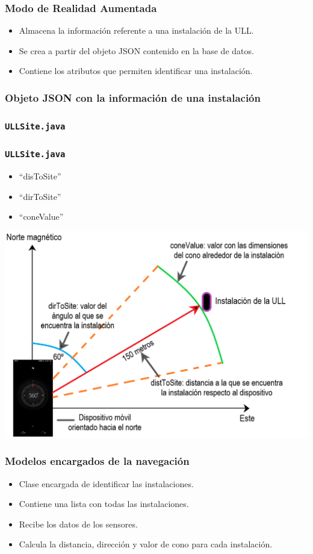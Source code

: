 \begin{frame}
	\frametitle{Modo de Realidad Aumentada}

			\begin{itemize}
				\item Almacena la información referente a una instalación de la ULL.
				\item Se crea a partir del objeto JSON contenido en la base de datos.
				\item Contiene los atributos que permiten identificar una instalación.
			\end{itemize}
			\endblock{}

\end{frame}
 
\begin{frame}
	\frametitle{Objeto JSON con la información de una instalación}
	
\end{frame}

\begin{frame}
	\frametitle{\texttt{ULLSite.java}}
	
\end{frame}


\begin{frame}
	\frametitle{\texttt{ULLSite.java}}
			\begin{itemize}
				\item  ``disToSite''
				\item ``dirToSite''
				\item ``coneValue''
			\end{itemize}
			\endblock{}
			\begin{center} 
				\includegraphics[width=0.65\linewidth]{Images/imagenAR}
			\end{center}
\end{frame}
 
\begin{frame}
	\frametitle{Modelos encargados de la navegación}
			\begin{itemize}
				\item Clase encargada de identificar las instalaciones.
				\item Contiene una lista con todas las instalaciones.
				\item Recibe los datos de los sensores.
				\item Calcula la distancia, dirección y valor de cono para cada instalación.
			\end{itemize}
			\endblock{}
\end{frame}
 
